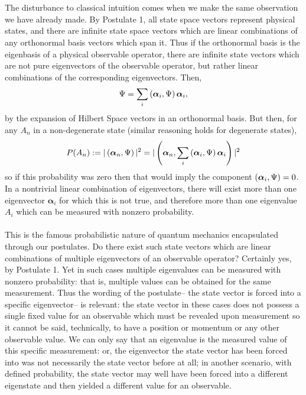 \\\\
The disturbance to classical intuition comes when we make the same observation we have already made. By Postulate 1, all state space vectors represent physical states, and there are infinite state space vectors which are linear combinations of any orthonormal basis vectors which span it. Thus if the orthonormal basis is the eigenbasis of a physical observable operator, there are infinite state vectors which are not pure eigenvectors of the observable operator, but rather linear combinations of the corresponding eigenvectors. Then,
$$
\Psi=\sum_{i}\left(\bm{\alpha}_{i},\Psi\right)\bm{\alpha}_{i},
$$
by the expansion of Hilbert Space vectors in an orthonormal basis. But then, for any $A_{n}$ in a non-degenerate state (similar reasoning holds for degenerate states),
$$
\begin{aligned}
P(A_{n}):=|\left(\bm{\alpha}_{n},\Psi\right)|^2=|\left(\bm{\alpha}_{n},\sum_{i}\left(\bm{\alpha}_{i},\Psi\right)\bm{\alpha}_{i}\right)|^2
\end{aligned}
$$
so if this probability was zero then that would imply the component $\left(\bm{\alpha}_{i},\Psi\right)=0$. In a nontrivial linear combination of eigenvectors, there will exist more than one eigenvector $\bm{\alpha}_{i}$ for which this is not true, and therefore more than one eigenvalue $A_{i}$ which can be measured with nonzero probability.
\\\\
This is the famous probabilistic nature of quantum mechanics encapsulated through our postulates. Do there exist such state vectors which are linear combinations of multiple eigenvectors of an observable operator? Certainly yes, by Postulate 1. Yet in such cases multiple eigenvalues can be measured with nonzero probability: that is, multiple values can be obtained for the same measurement. Thus the wording of the postulate-- the state vector is forced into a specific eigenvector-- is relevant: the state vector in these cases does not possess a single fixed value for an observable which must be revealed upon measurement so it cannot be said, technically, to have a position or momentum or any other observable value. We can only say that an eigenvalue is the measured value of this specific measurement: or, the eigenvector the state vector has been forced into was not necessarily the state vector before at all; in another scenario, with defined probability, the state vector may well have been forced into a different eigenstate and then yielded a different value for an observable. 

